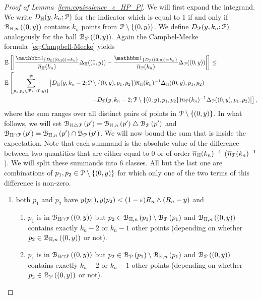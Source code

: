 \begin{proof}[Proof of Lemma~\ref{lem:equivalence_c_HP_P}]
We will first expand the integrand. We write $D_{\mathbb{H}}(y,k_n;{\mathcal P})$ for the indicator 
which is equal to 1 if and only if ${\mathcal B}_{\mathbb{H},n}\left((0,y)\right)$ contains $k_n$ points from 
${\mathcal P} \setminus \{(0,y)\}$. We define $D_{{\mathcal P}}(y,k_n;{\mathcal P})$ analogously for the 
ball ${\mathcal B}_{{\mathcal P}}\left((0,y)\right)$. 
Again the Campbel-Mecke formula~\eqref{eq:Campbell-Mecke} yields
\begin{align*} 
 &\Exp{ \left| \frac{\ind{D_\H((0,y)) = k_n}}{\expH} \Delta_\H ((0,y) )
        - \frac{\ind{D_\Pcal((0,y)) = k_n}}{\expP}  \Delta_\Pcal ((0,y))
        \right|}\leq \\
 & {\mathbb E} \left[ \sum_{p_1,p_2 \in \Pcal \setminus \{(0,y)\}}^{\not =} 
  \left| D_{\H}(y,k_n-2; \Pcal \setminus \{ (0,y),p_1,p_2 \}) \expH^{-1} \Delta_\H ((0,y),p_1,p_2) \right. \right.\\
  & \hspace{5cm} 
\left. \left. -   D_{\Pcal} (y,k_n-2;\Pcal \setminus \{(0,y),p_1,p_2\}) \expP^{-1} \Delta_{\Pcal} ((0,y),p_1,p_2)
   \right| \right],
\end{align*}
where the sum ranges over all distinct pairs of points in ${\mathcal P} \setminus \{ (0,y)\}$.
In what follows, we will set ${\mathcal B}_{\mathbb{H} \bigtriangleup {\mathcal P}}\left(p'\right) = {\mathcal B}_{\mathbb{H},n}\left(p'\right) \bigtriangleup {\mathcal B}_{{\mathcal P}}\left(p'\right)$ 
and ${\mathcal B}_{\mathbb{H} \cap {\mathcal P}}\left(p'\right) ={\mathcal B}_{\mathbb{H},n}\left(p'\right) \cap {\mathcal B}_{{\mathcal P}}\left(p'\right)$. 
We will now bound the sum that is inside the expectation. 
Note that each summand is the absolute value of the difference between two quantities  
that are either equal to 0 or of order $\overline{n}_{\mathbb{H}}(k_n)^{-1}$ ($\overline{n}_{{\mathcal P}}(k_n)^{-1}$).
We will split these summands into 6 classes. All but the last one are combinations of 
$p_1, p_2\in {\mathcal P} \setminus \{(0,y)\}$ for which only one of the two terms of this difference
is non-zero. 
\begin{enumerate} 
\item both $p_1$ and $p_2$ have $y(p_1),y(p_2) < (1-\varepsilon ) R_n \wedge (R_n-y)$ and 
\begin{enumerate}
\item $p_1$ is in ${\mathcal B}_{\mathbb{H} \cap {\mathcal P}}\left((0,y)\right)$ but $p_2 \in {\mathcal B}_{\mathbb{H},n}\left(p_1\right) \setminus {\mathcal B}_{{\mathcal P}}\left(p_1\right)$ 
and ${\mathcal B}_{\mathbb{H},n}\left((0,y)\right)$ contains exactly $k_n-2$ or $k_n-1$ other points (depending on whether 
$p_2 \in {\mathcal B}_{\mathbb{H},n}\left((0,y)\right)$ or not).
\item $p_1$ is in ${\mathcal B}_{\mathbb{H} \cap {\mathcal P}}\left((0,y)\right)$ but $p_2 \in {\mathcal B}_{{\mathcal P}}\left(p_1\right) \setminus {\mathcal B}_{\mathbb{H},n}\left(p_1\right)$ 
and ${\mathcal B}_{{\mathcal P}}\left((0,y)\right)$ contains exactly $k_n-2$ or $k_n-1$ other points (depending on whether 
$p_2 \in {\mathcal B}_{{\mathcal P}}\left((0,y)\right)$ or not).
\end{enumerate}

\end{enumerate}
\end{proof}
